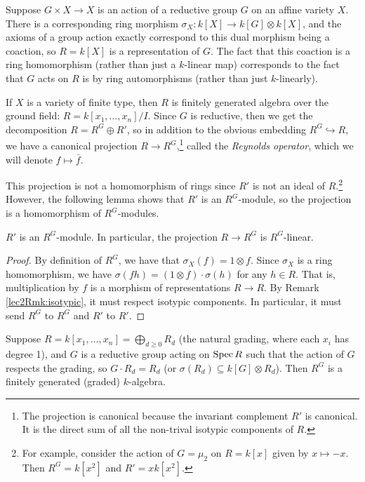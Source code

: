 

Suppose $G\times X\to X$ is an action of a reductive group $G$ on an affine variety $X$. There is a corresponding ring morphism $\sigma_X\colon k[X]\to k[G]\otimes k[X]$, and the axioms of a group action exactly correspond to this dual morphism being a coaction, so $R=k[X]$ is a representation of $G$. The fact that this coaction is a ring homomorphism (rather than just a $k$-linear map) corresponds to the fact that $G$ acts on $R$ is by ring automorphisms (rather than just $k$-linearly).

If $X$ is a variety of finite type, then $R$ is finitely generated algebra over the ground field: $R=k[x_1,\dots,x_n]/I$. Since $G$ is reductive, then we get the decomposition $R=R^G\oplus R'$, so in addition to the obvious embedding $R^G\hookrightarrow R$, we have a canonical projection $R\to R^G$,\footnote{The projection is canonical because the invariant complement $R'$ is canonical. It is the direct sum of all the non-trival isotypic components of $R$.} called the \emph{Reynolds operator}, which we will denote $f\mapsto \bar f$.
\begin{warning}
 This projection is not a homomorphism of rings since $R'$ is not an ideal of $R$.\footnote{For example, consider the action of $G=\mu_2$ on $R=k[x]$ given by $x\mapsto -x$. Then $R^G=k[x^2]$ and $R'=xk[x^2]$.} However, the following lemma shows that $R'$ is an $R^G$-module, so the projection is a homomorphism of $R^G$-modules.
\end{warning}
\begin{lemma}\label{lec3Lem:R^G-linear}
 $R'$ is an $R^G$-module. In particular, the projection $R\to R^G$ is $R^G$-linear.
\end{lemma}
\begin{proof}
 By definition of $R^G$, we have that $\sigma_X(f)=1\otimes f$. Since $\sigma_X$ is a ring homomorphism, we have $\sigma(fh)=(1\otimes f)\cdot \sigma(h)$ for any $h\in R$. That is, multiplication by $f$ is a morphism of representations $R\to R$. By Remark \ref{lec2Rmk:isotypic}, it must respect isotypic components. In particular, it must send $R^G$ to $R^G$ and $R'$ to $R'$.
\end{proof}
\begin{theorem}[Hilbert]\label{lec3Thm:Hilbert}
 Suppose $R=k[x_1,\dots, x_n]=\bigoplus_{d\ge 0} R_d$ (the natural grading, where each $x_i$ has degree 1), and $G$ is a reductive group acting on $\operatorname{Spec} R$ such that the action of $G$ respects the grading, so $G\cdot R_d=R_d$ (or $\sigma(R_d)\subseteq k[G]\otimes R_d$). Then $R^G$ is a finitely generated (graded) $k$-algebra.
\end{theorem}
